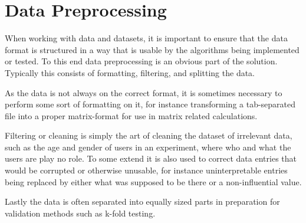 \section{Data Preprocessing}
When working with data and datasets, it is important to ensure that the data format is structured in a way that is usable by the algorithms being implemented or tested. To this end data preprocessing is an obvious part of the solution. Typically this consists of formatting, filtering, and splitting the data.

As the data is not always on the correct format, it is sometimes necessary to perform some sort of formatting on it, for instance transforming a tab-separated file into a proper matrix-format for use in matrix related calculations.

Filtering or cleaning is simply the art of cleaning the dataset of irrelevant data, such as the age and gender of users in an experiment, where who and what the users are play no role. To some extend it is also used to correct data entries that would be corrupted or otherwise unusable, for instance uninterpretable entries being replaced by either what was supposed to be there or a non-influential value.

Lastly the data is often separated into equally sized parts in preparation for validation methods such as k-fold testing.